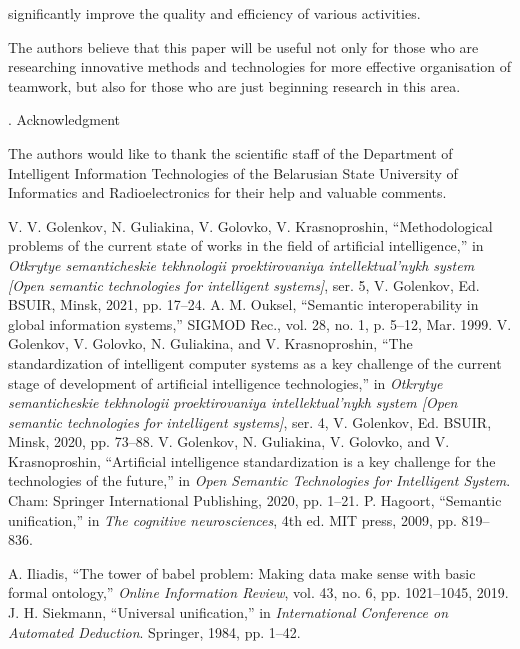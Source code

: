 \documentclass[a4paper]{article}
\newcommand{\RomanNumeralCaps}[1]
    {\MakeUppercase{\romannumeral #1}}
\begin{document}
\begin{multicols}{2}
significantly improve the quality and efficiency of various
activities.
\par The authors believe that this paper will be useful not
only for those who are researching innovative methods
and technologies for more effective organisation of teamwork, but also for those who are just beginning research
in this area.
\begin{center}
{\RomanNumeralCaps{6}. Acknowledgment}
\end{center}
\par The authors would like to thank the scientific staff of
the Department of Intelligent Information Technologies
of the Belarusian State University of Informatics and
Radioelectronics for their help and valuable 
comments.
\begin{center}
\begin{thebibliography}{46}
\fontsize{8}{5}\selectfont
\setlength{\parindent}{0.0cm}
\setlength{\parskip}{0.0cm}
     V. V. Golenkov, N. Guliakina, V. Golovko, V. Krasnoproshin,
“Methodological problems of the current state of works in
the field of artificial intelligence,” in \textit{Otkrytye semanticheskie
tekhnologii proektirovaniya intellektual’nykh system [Open semantic technologies for intelligent systems]}, ser. 5, V. Golenkov,
Ed. BSUIR, Minsk, 2021, pp. 17–24.
     A. M. Ouksel, “Semantic interoperability in global information
systems,” SIGMOD Rec., vol. 28, no. 1, p. 5–12, Mar. 1999.
     V. Golenkov, V. Golovko, N. Guliakina, and V. Krasnoproshin,
“The standardization of intelligent computer systems as a key
challenge of the current stage of development of artificial intelligence technologies,” in \textit{Otkrytye semanticheskie tekhnologii
proektirovaniya intellektual’nykh system [Open semantic technologies for intelligent systems]}, ser. 4, V. Golenkov, Ed. BSUIR,
Minsk, 2020, pp. 73–88.
     V. Golenkov, N. Guliakina, V. Golovko, and V. Krasnoproshin,
“Artificial intelligence standardization is a key challenge for the
technologies of the future,” in \textit{Open Semantic Technologies for
Intelligent System}. Cham: Springer International Publishing,
2020, pp. 1–21.
      P. Hagoort, “Semantic unification,” in \textit{The cognitive neurosciences}, 4th ed. MIT press, 2009, pp. 819–836.

     A. Iliadis, “The tower of babel problem: Making data make sense
with basic formal ontology,” \textit{Online Information Review}, vol. 43,
no. 6, pp. 1021–1045, 2019.
    J. H. Siekmann, “Universal unification,” in \textit{International Conference on Automated Deduction}. Springer, 1984, pp. 1–42.


\end{thebibliography}
\end{center}
\end{multicols}
\end{document}
